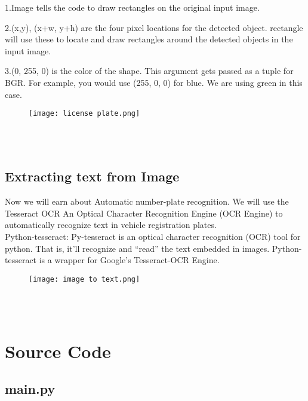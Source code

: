 \documentclass[12pt,a4paper]{report}
\begin{document}
1.Image tells the code to draw rectangles on the original input image.

2.(x,y), (x+w, y+h) are the four pixel locations for the detected object. rectangle will use these to locate and draw rectangles around the detected objects in the input image.

3.(0, 255, 0) is the color of the shape. This argument gets passed as a tuple for BGR. For example, you would use (255, 0, 0) for blue. We are using green in this case.
\begin{figure}[h!]
\texttt{[image: license plate.png]}
\caption{}
\end{figure}\\ \\

\newpage
\subsection{Extracting text from Image}
Now we will earn about Automatic number-plate recognition. We will use the Tesseract OCR An Optical Character Recognition Engine (OCR Engine) to automatically recognize text in vehicle registration plates.\\
Python-tesseract:
Py-tesseract is an optical character recognition (OCR) tool for python. That is, it’ll recognize and “read” the text embedded in images. Python-tesseract is a wrapper for Google’s Tesseract-OCR Engine.
\begin{figure}[h!]
\texttt{[image: image to text.png]}
\caption{}
\end{figure}\\ \\

\newpage
\section{Source Code}
\subsection{main.py}
\end{document}

